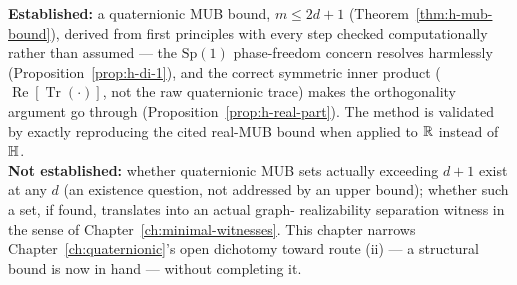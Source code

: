\begin{ledgerentry}
\textbf{Established:} a quaternionic MUB bound, $m\le2d+1$
(Theorem~\ref{thm:h-mub-bound}), derived from first principles with every
step checked computationally rather than assumed — the $\mathrm{Sp}(1)$
phase-freedom concern resolves harmlessly (Proposition~\ref{prop:h-di-1}),
and the correct symmetric inner product ($\operatorname{Re}[\operatorname{Tr}
(\cdot)]$, not the raw quaternionic trace) makes the orthogonality
argument go through (Proposition~\ref{prop:h-real-part}). The method is
validated by exactly reproducing the cited real-MUB bound when applied to
$\mathbb{R}$ instead of $\mathbb{H}$.\\
\textbf{Not established:} whether quaternionic MUB sets actually exceeding
$d+1$ exist at any $d$ (an existence question, not addressed by an upper
bound); whether such a set, if found, translates into an actual graph-
realizability separation witness in the sense of
Chapter~\ref{ch:minimal-witnesses}. This chapter narrows
Chapter~\ref{ch:quaternionic}'s open dichotomy toward route (ii) — a
structural bound is now in hand — without completing it.
\end{ledgerentry}
